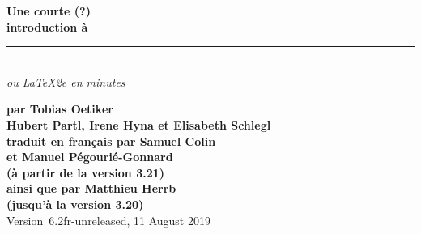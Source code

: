 

\ifpdf
\fi
\newlength{\centeroffset}
\setlength{\centeroffset}{-0.5\oddsidemargin}
\addtolength{\centeroffset}{0.5\evensidemargin}
\addtolength{\textwidth}{-\centeroffset}
\thispagestyle{empty}
\noindent\hspace*{\centeroffset}%
\begin{minipage}{\textwidth}
\parindent=0pt
\flushright
{\Huge\bfseries Une courte (?)\\ 
introduction à \LaTeXe}\\
\rule[-1ex]{\textwidth}{5pt}\\[2.5ex]
\emph{\Large ou \LaTeX2e en \pageref{LastPage} minutes}\\[2ex]
\end{minipage}

\noindent\hspace*{\centeroffset}\begin{minipage}{\textwidth}
\flushright
{\bfseries 
par Tobias Oetiker\\[1.5ex]
Hubert Partl, Irene Hyna et  Elisabeth Schlegl\\[1.5ex]
traduit en français par Samuel Colin\\
  et Manuel Pégourié-Gonnard\\
(à partir de la version 3.21)\\[3ex]
ainsi que par Matthieu Herrb\\
(jusqu'à la version 3.20)\\[3ex]}
Version~6.2fr-unreleased, 11 August 2019
\end{minipage}
\addtolength{\textwidth}{\centeroffset}


\pagebreak

\endinput


%

